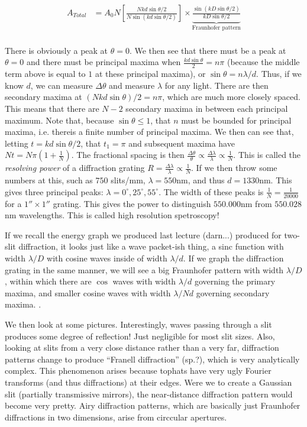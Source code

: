 \documentclass{report}
\begin{document}
\begin{align*}
A_{Total} &= A_0N\left[\frac{Nkd\sin\theta/2}{N\sin(kd\sin\theta/2)}\right]\times\underbrace{\frac{\sin(kD\sin\theta/2)}{kD\sin\theta/2}}_{\text{Fraunhofer pattern}}\\
\end{align*}

There is obviously a peak at $\theta = 0$. We then see that there must be a peak at $\theta = 0$ and there must be principal maxima when $\frac{kd\sin\theta}{2} = n\pi$ (because the middle term above is equal to $1$ at these principal maxima), or $\sin\theta = n\lambda/d$. Thus, if we know $d$, we can measure $\Delta \theta$ and measure $\lambda$ for any light. There are then secondary maxima at $(Nkd\sin\theta)/2 = n\pi$, which are much more closely spaced. This means that there are $N-2$ secondary maxima in between each principal maximum. Note that, because $\sin\theta \leq 1$, that $n$ must be bounded for principal maxima, i.e. thereis a finite number of principal maxima. We then can see that, letting $t = kd\sin\theta/2$, that $t_1 = \pi$ and subsequent maxima have $Nt = N\pi(1+\frac{1}{N})$. The fractional spacing is then $\frac{\Delta\theta}{\theta} \propto\frac{\Delta\lambda}{\lambda} \propto \frac{1}{N}$. This is called the \emph{resolving power} of a diffraction grating $R = \frac{\Delta\lambda}{\lambda} \propto \frac{1}{N}$. If we then throw some numbers at this, such as $750$ slits/mm, $\lambda = 550$nm, and thus $d = 1330$nm. This gives three principal peaks: $\lambda = 0^\circ, 25^\circ, 55^\circ$. The width of these peaks is $\frac{1}{N} = \frac{1}{20000}$ for a $1''\times1''$ grating. This gives the power to distinguish $550.000$nm from $550.028$nm wavelengths. This is called high resolution spetroscopy!

If we recall the energy graph we produced last lecture (darn...) produced for two-slit diffraction, it looks just like a wave packet-ish thing, a sinc function with width $\lambda/D$ with cosine waves inside of width $\lambda/d$. If we graph the diffraction grating in the same manner, we will see a big Fraunhofer pattern with width $\lambda/D$ , within which there are $\cos$ waves with width $\lambda/d$ governing the primary maxima, and smaller cosine waves with width $\lambda/Nd$ governing secondary maxima. . 

We then look at some pictures. Interestingly, waves passing through a slit produces some degree of reflection! Just negligible for most slit sizes. Also, looking at slits from a very close distance rather than a very far, diffraction patterns change to produce ``Franell diffraction'' (sp.?), which is very analytically complex. This phenomenon arises because tophats have very ugly Fourier transforms (and thus diffractions) at their edges. Were we to create a Gaussian slit (partially transmissive mirrors), the near-distance diffraction pattern would become very pretty. Airy diffraction patterns, which are basically just Fraunhofer diffractions in two dimensions, arise from circcular apertures. 
\end{document}
